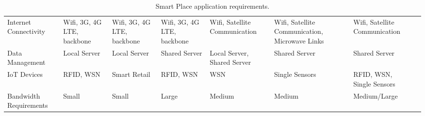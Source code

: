 \begin{landscape}
\begin{table}[p]
\begin{adjustbox}{width=\textwidth}
\begin{tabular}{*{14}{l}}
      Internet Connectivity  & \multicolumn{2}{p{\colWidth}}{\raggedright Wifi, 3G, 4G LTE, backbone} & \multicolumn{2}{p{\colWidth}}{\raggedright Wifi, 3G, 4G LTE, backbone} & \multicolumn{2}{p{\colWidth}}{\raggedright Wifi, 3G, 4G LTE, backbone}              & \multicolumn{2}{p{\colWidth}}{\raggedright Wifi, Satellite Communication}     & \multicolumn{2}{p{\colWidth}}{\raggedright Wifi, Satellite Communication, Microwave Links}   & \multicolumn{2}{p{\colWidth}}{\raggedright Wifi, Satellite Communication}            \\
      Data Management        & \multicolumn{2}{p{\colWidth}}{\raggedright Local Server}               & \multicolumn{2}{p{\colWidth}}{\raggedright Local Server}               & \multicolumn{2}{p{\colWidth}}{\raggedright Shared Server}                           & \multicolumn{2}{p{\colWidth}}{\raggedright Local Server, Shared Server}       & \multicolumn{2}{p{\colWidth}}{\raggedright Shared Server}                                    & \multicolumn{2}{p{\colWidth}}{\raggedright Shared Server}                            \\
      IoT Devices            & \multicolumn{2}{p{\colWidth}}{\raggedright RFID, WSN}                  & \multicolumn{2}{p{\colWidth}}{\raggedright Smart Retail}               & \multicolumn{2}{p{\colWidth}}{\raggedright RFID, WSN}                               & \multicolumn{2}{p{\colWidth}}{\raggedright WSN}                               & \multicolumn{2}{p{\colWidth}}{\raggedright Single Sensors}                                   & \multicolumn{2}{p{\colWidth}}{\raggedright RFID, WSN, Single Sensors}                \\
      Bandwidth Requirements & \multicolumn{2}{p{\colWidth}}{\raggedright Small}                      & \multicolumn{2}{p{\colWidth}}{\raggedright Small}                      & \multicolumn{2}{p{\colWidth}}{\raggedright Large}                                   & \multicolumn{2}{p{\colWidth}}{\raggedright Medium}                            & \multicolumn{2}{p{\colWidth}}{\raggedright Medium}                                           & \multicolumn{2}{p{\colWidth}}{\raggedright Medium/Large}                             \\
      \bottomrule
      \end{tabular}
    \end{adjustbox}
    \caption{Smart Place application requirements.}
    \label{table:smart_places_characteristics}
  \end{table}
\end{landscape}
